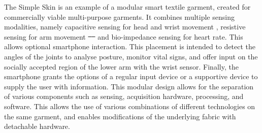 \documentclass{sigchi}
\providecommand{\DIFdeltex}[1]{{\protect\color{red}\sout{#1}}}                      %
\providecommand{\DIFdelbegin}{} %
\providecommand{\DIFdelend}{} %
\providecommand{\DIFdel}[1]{\texorpdfstring{\DIFdeltex{#1}}{}} %
\newcommand{\DIFscaledelfig}{0.5}
\newlength{\DIFdelgraphicswidth} %
\newlength{\DIFdelgraphicsheight} %
\newcommand{\DIFdelincludegraphics}[2][]{%
\sbox{\DIFdelgraphicsbox}{\DIFOincludegraphics[#1]{#2}}%
\settoboxwidth{\DIFdelgraphicswidth}{\DIFdelgraphicsbox} %
\settoboxtotalheight{\DIFdelgraphicsheight}{\DIFdelgraphicsbox} %
\scalebox{\DIFscaledelfig}{%
\parbox[b]{\DIFdelgraphicswidth}{\usebox{\DIFdelgraphicsbox}\\[-\baselineskip] \rule{\DIFdelgraphicswidth}{0em}}\llap{\resizebox{\DIFdelgraphicswidth}{\DIFdelgraphicsheight}{%
\setlength{\unitlength}{\DIFdelgraphicswidth}%
\begin{picture}(1,1)%
\thicklines\linethickness{2pt} %
{\color[rgb]{1,0,0}\put(0,0){\framebox(1,1){}}}%
{\color[rgb]{1,0,0}\put(0,0){\line( 1,1){1}}}%
{\color[rgb]{1,0,0}\put(0,1){\line(1,-1){1}}}%
\end{picture}%
}\hspace*{3pt}}} %
} %
\DeclareRobustCommand{\DIFdelbegin}{\DIFOdelbegin \let\includegraphics\DIFdelincludegraphics} %
\DeclareRobustCommand{\DIFdelend}{\DIFOaddend \let\includegraphics\DIFOincludegraphics} %
\begin{document}
The Simple Skin \cite{simpleskin} is an example of a modular smart textile garment, created for commercially viable multi-purpose garments. It combines multiple sensing modalities, namely capacitive sensing for head and wrist movement , resistive sensing for arm movement
\DIFdelbegin \DIFdel{\mbox{%
\cite{vogel4} }\hspace{0pt}%
}\DIFdelend %
and bio-impedance sensing for heart rate. This allows optional smartphone interaction. This placement is intended to detect the angles of the joints to analyse posture, monitor vital signs, and offer input on the socially accepted region of the lower arm with the wrist sensor. Finally, the smartphone grants the options of a regular input device or a supportive device to supply the user with  information. This modular design allows for the separation of various components such as sensing, acquisition hardware, processing, and software. This allows the use of various combinations of different technologies on the same garment, and enables modifications of the underlying fabric with detachable hardware. \cite{simpleskin}
\end{document}

